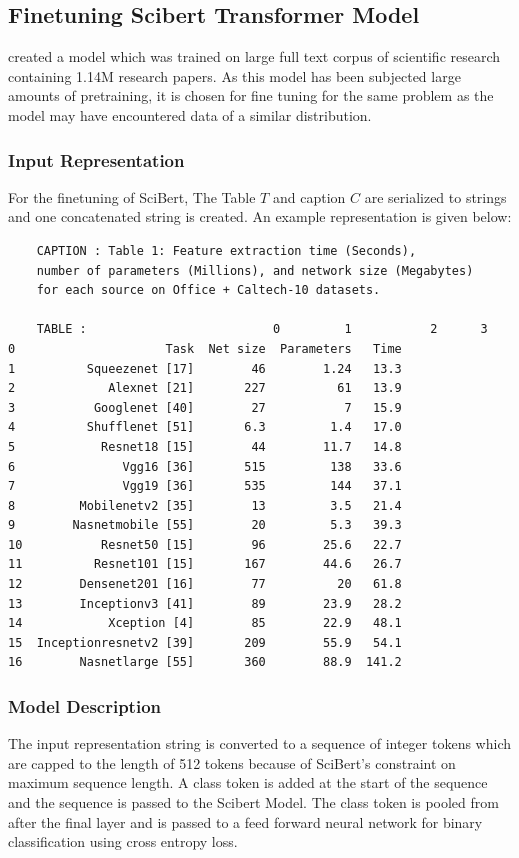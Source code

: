 \subsection{Finetuning Scibert Transformer Model}
\cite{beltagy2019scibert} created a model which was trained on large full text corpus of scientific research containing 1.14M research papers. As this model has been subjected large amounts of pretraining, it is chosen for fine tuning for the same problem as the model may have encountered data of a similar distribution. 
\subsubsection{Input Representation}
\label{table_classification:models:sb:input_rep}
For the finetuning of SciBert, The Table $T$ and caption $C$ are serialized to strings and one concatenated string is created. An example representation is given below: 
\begin{verbatim}
    CAPTION : Table 1: Feature extraction time (Seconds), 
    number of parameters (Millions), and network size (Megabytes) 
    for each source on Office + Caltech-10 datasets.

    TABLE :                          0         1           2      3
0                     Task  Net size  Parameters   Time
1          Squeezenet [17]        46        1.24   13.3
2             Alexnet [21]       227          61   13.9
3           Googlenet [40]        27           7   15.9
4          Shufflenet [51]       6.3         1.4   17.0
5            Resnet18 [15]        44        11.7   14.8
6               Vgg16 [36]       515         138   33.6
7               Vgg19 [36]       535         144   37.1
8         Mobilenetv2 [35]        13         3.5   21.4
9        Nasnetmobile [55]        20         5.3   39.3
10           Resnet50 [15]        96        25.6   22.7
11          Resnet101 [15]       167        44.6   26.7
12        Densenet201 [16]        77          20   61.8
13        Inceptionv3 [41]        89        23.9   28.2
14            Xception [4]        85        22.9   48.1
15  Inceptionresnetv2 [39]       209        55.9   54.1
16        Nasnetlarge [55]       360        88.9  141.2
\end{verbatim}

\subsubsection{Model Description}
The input representation string is converted to a sequence of integer tokens which are capped to the length of 512 tokens because of SciBert's constraint on maximum sequence length. A class token is added at the start of the sequence and the sequence is passed to the Scibert Model. The class token is pooled from after the final layer and is passed to a feed forward neural network for binary classification using cross entropy loss. 

